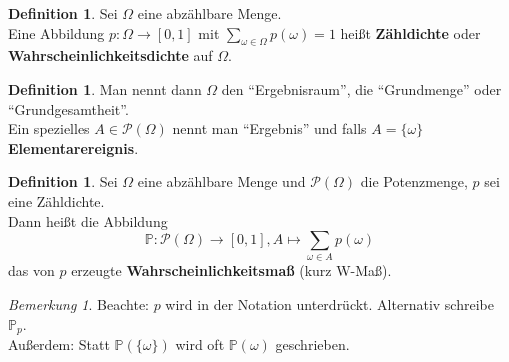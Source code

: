 \documentclass[10pt,a4paper]{article}
\newcommand{\potset}{\mathscr P}
\newcommand{\Prb}{\mathbb P}
\theoremstyle{plain}
\theoremstyle{definition}
\newtheorem{definition}[theorem]{Definition}
\theoremstyle{remark}
\newtheorem{bem}[theorem]{Bemerkung}
\begin{document}
	\begin{definition}
		Sei $\Omega$ eine abzählbare Menge.\\
		Eine Abbildung $p:\Omega\to[0,1]$ mit $\sum_{\omega\in\Omega}p(\omega)=1$ heißt \textbf{Zähldichte} oder \textbf{Wahrscheinlichkeitsdichte} auf $\Omega$.
	\end{definition}

	\begin{definition}
		Man nennt dann $\Omega$ den \enquote{Ergebnisraum}, die \enquote{Grundmenge} oder \enquote{Grundgesamtheit}.\\
		Ein spezielles $A\in\potset(\Omega)$ nennt man \enquote{Ergebnis} und falls $A=\{\omega\}$ \textbf{Elementarereignis}.
	\end{definition}

	\begin{definition}
		Sei $\Omega$ eine abzählbare Menge und $\potset(\Omega)$ die Potenzmenge, $p$ sei eine Zähldichte.\\
		Dann heißt die Abbildung 
		\[\Prb:\potset(\Omega)\to[0,1],A\mapsto \sum_{\omega\in A}p(\omega)\]
		 das von $p$ erzeugte \textbf{Wahrscheinlichkeitsmaß} (kurz W-Maß).
	\end{definition}
	
	\begin{bem}
		Beachte: $p$ wird in der Notation unterdrückt. Alternativ schreibe $\Prb_p$.\\
		Außerdem: Statt $\Prb(\{\omega\})$ wird oft $\Prb(\omega)$ geschrieben.
	\end{bem}
	
\end{document}
